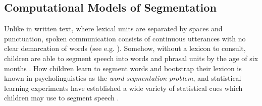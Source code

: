 

\subsection{Computational Models of Segmentation}\label{sec:15-wordseg}


Unlike in written text, where lexical units are separated by spaces and punctuation, spoken communication consists of continuous utterances with no clear demarcation of words (see e.g. \citet{cole1980model}). Somehow, without a lexicon to consult, children are able to segment speech into words and phrasal units by the age of six months \citep{Jusczyk1999infants}. How children learn to segment words and bootstrap their lexicon is known in psycholinguistics as the \emph{word segmentation problem}, and statistical learning experiments have established a wide variety of statistical cues which children may use to segment speech \citep{Cutler1987, gleitman1988learning, Jusczyk1993stress, Saffran1996distributional, Jusczyk1999allophonic, Suomi1997}.

